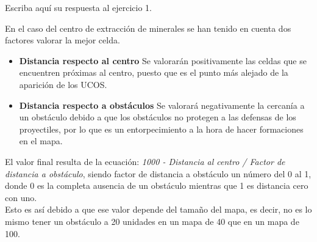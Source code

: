 Escriba aquí su respuesta al ejercicio 1. 


En el caso del centro de extracción de minerales se han tenido en cuenta dos
factores valorar la mejor celda.
\begin{itemize}
    \item \textbf{Distancia respecto al centro} Se valorarán positivamente las celdas que se encuentren próximas al centro, 
    puesto que es el punto más alejado de la aparición de los UCOS.
    \item \textbf{Distancia respecto a obstáculos} Se valorará negativamente la cercanía
    a un obstáculo debido a que los obstáculos no protegen a las defensas de los proyectiles, por lo que es un entorpecimiento a la hora de hacer 
    formaciones en el mapa.
\end{itemize}

El valor final resulta de la ecuación: \textit{1000 - Distancia al centro / Factor de distancia a obstáculo}, siendo factor de distancia a obstáculo un número del 0 al 1, donde 0 es la completa ausencia de un obstáculo mientras que 1 es distancia cero con uno.
\\
Esto es así debido a que ese valor depende del tamaño del mapa, es decir, no es lo mismo tener un obstáculo a 20 unidades en un mapa de 40 que en un mapa de 100.
